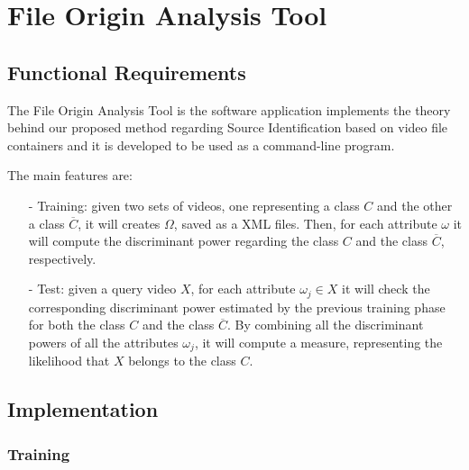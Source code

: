 \section{File Origin Analysis Tool}

\subsection{Functional Requirements}

The File Origin Analysis Tool is the software application implements the theory behind our proposed method regarding Source Identification based on video file containers and it is developed to be used as a command-line program.

The main features are:
\begin{itemize}

\item[-] Training: given two sets of videos, one representing a class $C$ and the other a class $\overline{C}$, it will creates $\Omega$, saved as a XML files. Then, for each attribute $\omega$ it will compute the discriminant power regarding the class $C$ and the class $\overline{C}$, respectively.

\item[-] Test: given a query video $X$, for each attribute $\omega_{j} \in X$ it will check the corresponding discriminant power estimated by the previous training phase for both the class $C$ and the class $\overline{C}$. By combining all the discriminant powers of all the attributes $\omega_{j}$, it will compute a measure, representing the likelihood that $X$ belongs to the class $C$.

\end{itemize}

\subsection{Implementation}

\subsubsection{Training}

